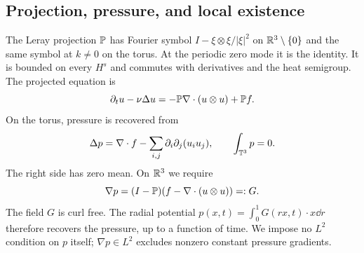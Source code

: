 \subsection{Projection, pressure, and local existence}\label{sec:analytic}
The Leray projection $\mathbb P$ has Fourier symbol
$I-\xi\otimes\xi/|\xi|^2$ on $\mathbb R^3\setminus\{0\}$ and the same
symbol at $k\ne0$ on the torus. At the periodic zero mode it is the
identity. It is bounded on every $H^s$ and commutes with derivatives and
the heat semigroup. The projected equation is
\begin{equation}\label{eq:projected}
 \partial_tu-\nu\Delta u=-\mathbb P\nabla\cdot(u\otimes u)+\mathbb P f.
\end{equation}
On the torus, pressure is recovered from
\[
 \Delta p=\nabla\cdot f-\sum_{i,j}\partial_i\partial_j(u_i u_j),
 \qquad \int_{\mathbb T^3}p=0.
\]
The right side has zero mean. On $\mathbb R^3$ we require
\begin{equation}\label{eq:Rpressure}
 \nabla p=(I-\mathbb P)(f-\nabla\cdot(u\otimes u))=:G.
\end{equation}
The field $G$ is curl free. The radial potential
$p(x,t)=\int_0^1G(rx,t)\cdot x\dd r$ therefore recovers the pressure,
up to a function of time. We impose no $L^2$ condition on $p$ itself;
$\nabla p\in L^2$ excludes nonzero constant pressure gradients.

